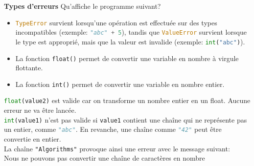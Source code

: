  \begin{Exercice}[5 minutes] [Python] \textbf{Types d'erreurs} Qu'affiche le programme suivant? \\
    
    
     \begin{conseil}
        \begin{itemize}
            \item \lstinline[language=python]|TypeError| survient lorsqu'une opération est effectuée sur des types incompatibles (exemple: \lstinline[language=python]|"abc" + 5|), tandis que \lstinline[language=python]|ValueError| survient lorsque le type est approprié, mais que la valeur est invalide (exemple: \lstinline[language=python]|int("abc")|).
            \item La fonction \lstinline{float()} permet de convertir une variable en nombre à virgule flottante.
            \item La fonction \lstinline{int()} permet de convertir une variable en nombre entier.
        \end{itemize}  
    \end{conseil}

     \begin{solution}
        \lstinline[language=python]|float(value2)| est valide car on transforme un nombre entier en un float. Aucune erreur ne va être lancée.\\
        \lstinline[language=python]|int(value1)| n'est pas valide si \lstinline[language=python]|value1| contient une chaîne qui ne représente pas un entier, comme \lstinline[language=python]|"abc"|. En revanche, une chaîne comme \lstinline[language=python]|"42"| peut être convertie en entier. \\
        
        La chaîne \texttt{"Algorithms"} provoque ainsi une erreur avec le message suivant:\\
        Nous ne pouvons pas convertir une chaîne de caractères en nombre
     \end{solution}

\end{Exercice}
 
